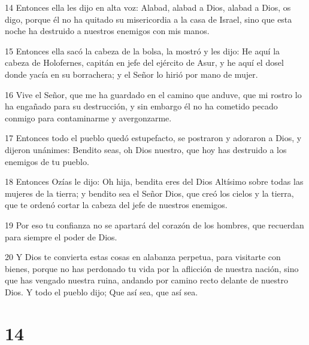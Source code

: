 \par 14 Entonces ella les dijo en alta voz: Alabad, alabad a Dios, alabad a Dios, os digo, porque él no ha quitado su misericordia a la casa de Israel, sino que esta noche ha destruido a nuestros enemigos con mis manos.
\par 15 Entonces ella sacó la cabeza de la bolsa, la mostró y les dijo: He aquí la cabeza de Holofernes, capitán en jefe del ejército de Asur, y he aquí el dosel donde yacía en su borrachera; y el Señor lo hirió por mano de mujer.
\par 16 Vive el Señor, que me ha guardado en el camino que anduve, que mi rostro lo ha engañado para su destrucción, y sin embargo él no ha cometido pecado conmigo para contaminarme y avergonzarme.
\par 17 Entonces todo el pueblo quedó estupefacto, se postraron y adoraron a Dios, y dijeron unánimes: Bendito seas, oh Dios nuestro, que hoy has destruido a los enemigos de tu pueblo.
\par 18 Entonces Ozías le dijo: Oh hija, bendita eres del Dios Altísimo sobre todas las mujeres de la tierra; y bendito sea el Señor Dios, que creó los cielos y la tierra, que te ordenó cortar la cabeza del jefe de nuestros enemigos.
\par 19 Por eso tu confianza no se apartará del corazón de los hombres, que recuerdan para siempre el poder de Dios.
\par 20 Y Dios te convierta estas cosas en alabanza perpetua, para visitarte con bienes, porque no has perdonado tu vida por la aflicción de nuestra nación, sino que has vengado nuestra ruina, andando por camino recto delante de nuestro Dios. Y todo el pueblo dijo; Que así sea, que así sea.

\chapter{14}

